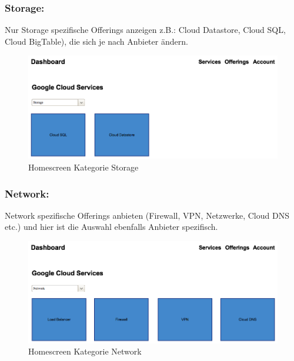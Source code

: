 \subsubsection{Storage:}

Nur Storage spezifische Offerings anzeigen z.B.: Cloud Datastore, Cloud SQL, 
Cloud BigTable), die sich je nach Anbieter ändern. 
\begin{figure}[!htbp]
 \includegraphics[width=\textwidth]{./03_Analyse/03_Dashboard/images/homescreen_google_storage}
  \caption{Homescreen Kategorie Storage}
\end{figure}

\subsubsection{Network:}
Network spezifische Offerings anbieten (Firewall, VPN, Netzwerke, Cloud DNS etc.) 
und hier ist die Auswahl ebenfalls Anbieter spezifisch. 

\begin{figure}[!htbp]
 \includegraphics[width=\textwidth]{./03_Analyse/03_Dashboard/images/homescreen_google_network}
    \caption{Homescreen Kategorie Network}
\end{figure}

\newpage

